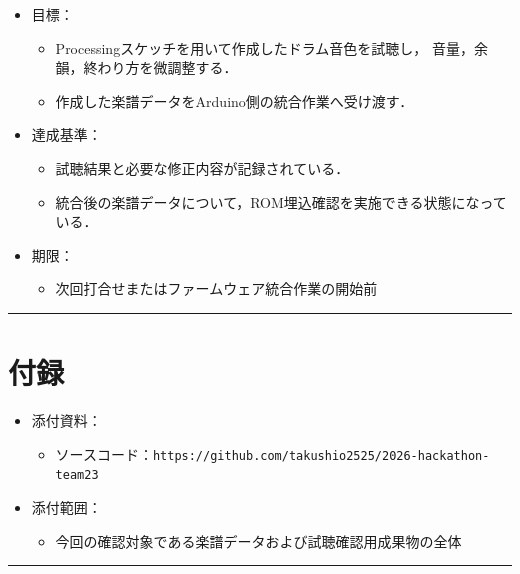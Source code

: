 \documentclass[uplatex,dvipdfmx,a4paper,11pt]{jsarticle}
\newcommand{\sectionrule}{\par\medskip\noindent\rule{\linewidth}{0.6pt}\par\medskip}
\begin{document}
\begin{itemize}
  \item 目標：
    \begin{itemize}
      \item {}Processingスケッチを用いて作成したドラム音色を試聴し，
        音量，余韻，終わり方を微調整する．
      \item {}作成した楽譜データをArduino側の統合作業へ受け渡す．
    \end{itemize}
  \item 達成基準：
    \begin{itemize}
      \item {}試聴結果と必要な修正内容が記録されている．
      \item {}統合後の楽譜データについて，ROM埋込確認を実施できる状態になっている．
    \end{itemize}
  \item 期限：
    \begin{itemize}
      \item {}次回打合せまたはファームウェア統合作業の開始前
    \end{itemize}
\end{itemize}

\sectionrule


\section{付録}

\begin{itemize}
  \item 添付資料：
    \begin{itemize}
      \item ソースコード：\texttt{https://github.com/takushio2525/2026-hackathon-team23}
    \end{itemize}
  \item 添付範囲：
    \begin{itemize}
      \item 今回の確認対象である楽譜データおよび試聴確認用成果物の全体
    \end{itemize}
\end{itemize}

\sectionrule
\end{document}
